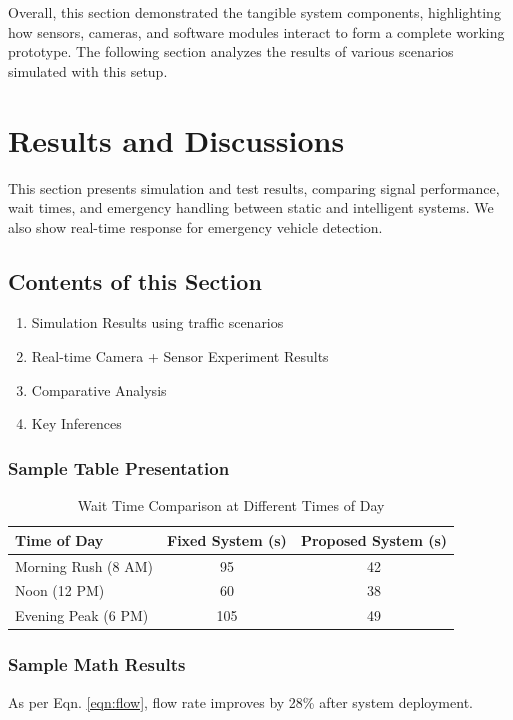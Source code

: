 \documentclass[12pt]{report}
\begin{document}
\vspace{0.5cm}

Overall, this section demonstrated the tangible system components, highlighting how sensors, cameras, and software modules interact to form a complete working prototype. The following section analyzes the results of various scenarios simulated with this setup.

\chapter{Results and Discussions}

This section presents simulation and test results, comparing signal performance, wait times, and emergency handling between static and intelligent systems. We also show real-time response for emergency vehicle detection.

\section{Contents of this Section}
\begin{enumerate}
\item Simulation Results using traffic scenarios
\item Real-time Camera + Sensor Experiment Results
\item Comparative Analysis
\item Key Inferences
\end{enumerate}

\subsection{Sample Table Presentation}
\begin{table}[htb]
\fontsize{10}{12}\selectfont
\caption{Wait Time Comparison at Different Times of Day}
\label{res:tab1}
\begin{tabular}{|p{4cm}|c|c|}
\hline
\textbf{Time of Day} & \textbf{Fixed System (s)} & \textbf{Proposed System (s)} \\\hline
Morning Rush (8 AM) & 95 & 42 \\\hline
Noon (12 PM) & 60 & 38 \\\hline
Evening Peak (6 PM) & 105 & 49 \\\hline
\end{tabular}
\end{table}

\subsection{Sample Math Results}
As per Eqn. \ref{eqn:flow}, flow rate improves by 28\% after system deployment.
\end{document}
